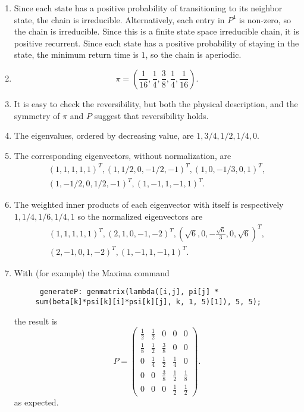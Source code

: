 \documentclass[12pt]{article}
\begin{document}
\begin{solution}
    \begin{enumerate}[label=(\alph*)]
    \item
        Since each state has a positive probability of transitioning to
        its neighbor state, the chain is irreducible.  Alternatively,
        each entry in \( P^4 \) is non-zero, so the chain is
        irreducible.  Since this is a finite state space irreducible
        chain, it is positive recurrent.  Since each state has a
        positive probability of staying in the state, the minimum return
        time is \( 1 \), so the chain is aperiodic.
    \item
        \[
            \pi = \left( \frac{1}{16}, \frac{1}{4}, \frac{3}{8}, \frac{1}
            {4}, \frac{1}{16} \right).
        \]
    \item
        It is easy to check the reversibility, but both the physical
        description, and the symmetry of \( \pi \) and \( P \) suggest
        that reversibility holds.
    \item
        The eigenvalues, ordered by decreasing value, are \(
        1,3/4,1/2,1/4,0 \).
    \item
        The corresponding eigenvectors, without normalization, are
        \begin{multline*}
            (1,1,1,1,1)^T,(1,1/2,0,-1/2,-1)^T,(1,0,-1/3,0,1)^T, \\
            (1,-1/2,0,1/2,-1)^T, (1,-1,1,-1,1)^T.
        \end{multline*}
    \item
        The weighted inner products of each eigenvector with itself is
        respectively \( 1, 1/4, 1/6, 1/4, 1 \) so the normalized
        eigenvectors are
        \begin{multline*}
            \left( 1,1,1,1,1\right)^T, \left( 2,1,0,-1,-2\right)^T,
            \left( \sqrt{6},0,-\frac{\sqrt{6}}{3},0,\sqrt{6}\right)^T,
            \\
            \left( 2,-1,0,1,-2\right)^T, \left( 1,-1,1,-1,1\right)^T.
        \end{multline*}
    \item
        With (for example) the Maxima command
\begin{verbatim}
      generateP: genmatrix(lambda([i,j], pi[j] *
     sum(beta[k]*psi[k][i]*psi[k][j], k, 1, 5)[1]), 5, 5);
\end{verbatim}
        the result is
        \[
            P =
            \begin{pmatrix}
                \frac{1}{2} & \frac{1}{2} & 0 & 0 & 0\\
                \frac{1}{8} & \frac{1}{2} & \frac{3}{8} & 0 & 0\\
                0 & \frac{1}{4} & \frac{1}{2} & \frac{1}{4} & 0\\
                0 & 0 & \frac{3}{8} & \frac{1}{2} & \frac{1}{8}\\
                0 & 0 & 0 & \frac{1}{2} & \frac{1}{2}
            \end{pmatrix}
            .
        \] as expected.
\end{enumerate}
\end{solution}
\end{document}
